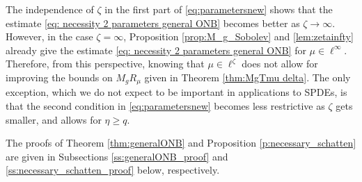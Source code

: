 \documentclass[reqno]{amsart}
\theoremstyle{plain}
\theoremstyle{remark}
\theoremstyle{plain}
\numberwithin{equation}{section}
\newcommand{\1}{\one}
\begin{document}
The independence of $\zeta$ in the first part of \eqref{eq:parametersnew} shows that the estimate \eqref{eq: necessity 2 parameters general ONB} becomes better as $\zeta\to \infty$. However, in the case $\zeta=\infty$, Proposition \ref{prop:M_g_Sobolev} and \ref{lem:zetainfty} already give the estimate \eqref{eq: necessity 2 parameters general ONB} for $\mu\in \ell^\infty$. Therefore, from this perspective, knowing that $\mu\in \ell^\zeta$ does not allow for improving the bounds on $M_g R_{\mu}$ given in Theorem \ref{thm:MgTmu delta}. The only exception, which we do not expect to be important in applications to SPDEs, is that the second condition in \eqref{eq:parametersnew} becomes less restrictive as $\zeta$ gets smaller, and allows for $\eta\geq q$.



\smallskip

The proofs of Theorem \ref{thm:generalONB} and Proposition \ref{p:necessary_schatten} are given in Subsections \ref{ss:generalONB_proof} and \ref{ss:necessary_schatten_proof}  below, respectively.
\end{document}
